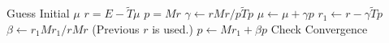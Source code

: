 \documentclass[preview=true]{standalone}
\begin{document}
\begin{algorithmic}
\State Guess Initial $\mu$
\State $r = E - \tilde{T}\mu$
\State $p = M r$
   \State $\gamma \gets r M r / p \tilde{T} p$
   \State $\mu    \gets \mu + \gamma p$
   \State $r_1    \gets r - \gamma \tilde{T} p$
   \State $\beta  \gets r_1 M r_1 / r M r$ (Previous $r$ is used.)
   \State $p      \gets M r_1 + \beta p$
   \State Check Convergence
\EndWhile
\EndProcedure
\end{algorithmic}
\end{document}
